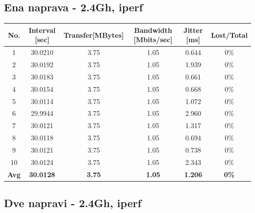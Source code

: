 \documentclass[11pt,a4paper,slovene]{article}
\begin{document}
\subsection{Ena naprava - 2.4Gh, iperf}

\begin{table}[H]
	\begin{adjustwidth}{-3cm}{-3cm}
	\centering
		\begin{tabular}{c|c|c|c|c|c}
		\hline
		\textbf{No.} & \textbf{Interval [sec]} & \textbf{Transfer[MBytes]} & \textbf{Bandwidth [Mbits/sec]} & \textbf{Jitter [ms]} & \textbf{Lost/Total} \\
     		\hline
     		1 & 30.0210 & 3.75 & 1.05 & 0.644 & 0\% \\
  		2 & 30.0192 & 3.75 & 1.05 & 1.939 & 0\% \\
  		3 & 30.0183 & 3.75 & 1.05 & 0.661 & 0\% \\
  		4 & 30.0154 & 3.75 & 1.05 & 0.668 & 0\% \\
  		5 & 30.0114 & 3.75 & 1.05 & 1.072 & 0\% \\
  		6 & 29.9944 & 3.75 & 1.05 & 2.960 & 0\% \\
  		7 & 30.0121 & 3.75 & 1.05 & 1.317 & 0\% \\
  		8 & 30.0118 & 3.75 & 1.05 & 0.694 & 0\% \\
  		9 & 30.0121 & 3.75 & 1.05 & 0.738 & 0\% \\
  		10 & 30.0124 & 3.75 & 1.05 & 2.343 & 0\% \\
  		\hline
  		\textbf{Avg} & \textbf{30.0128} & \textbf{3.75} & \textbf{1.05} & \textbf{1.206} & \textbf{0\%} \\
  		\hline
    		\end{tabular}
    	\end{adjustwidth}
\end{table}

\subsection{Dve napravi - 2.4Gh, iperf}
 
\end{document}
